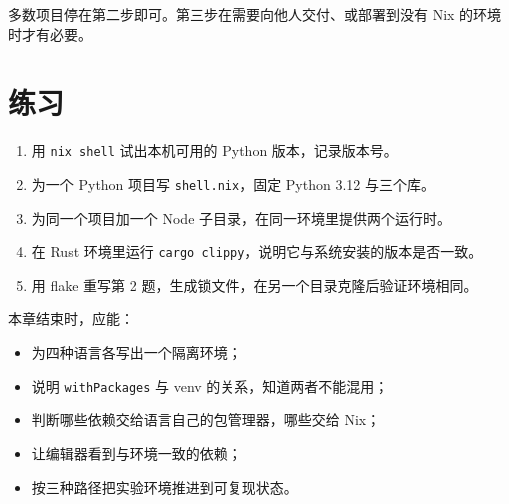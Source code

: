 多数项目停在第二步即可。第三步在需要向他人交付、或部署到没有 Nix 的环境时才有必要。

\section{练习}

\begin{enumerate}
  \item 用 \texttt{nix shell} 试出本机可用的 Python 版本，记录版本号。
  \item 为一个 Python 项目写 \texttt{shell.nix}，固定 Python 3.12 与三个库。
  \item 为同一个项目加一个 Node 子目录，在同一环境里提供两个运行时。
  \item 在 Rust 环境里运行 \texttt{cargo clippy}，说明它与系统安装的版本是否一致。
  \item 用 flake 重写第 2 题，生成锁文件，在另一个目录克隆后验证环境相同。
\end{enumerate}

\begin{checkpoint}
本章结束时，应能：
\begin{itemize}
  \item 为四种语言各写出一个隔离环境；
  \item 说明 \texttt{withPackages} 与 venv 的关系，知道两者不能混用；
  \item 判断哪些依赖交给语言自己的包管理器，哪些交给 Nix；
  \item 让编辑器看到与环境一致的依赖；
  \item 按三种路径把实验环境推进到可复现状态。
\end{itemize}
\end{checkpoint}
